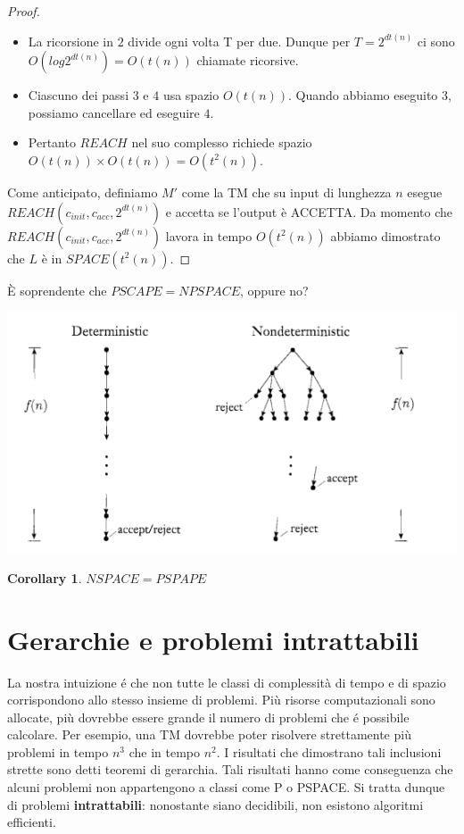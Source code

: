\documentclass[a4paper, 12pt]{article}
\newtheorem{corollary}{Corollary}[theorem]
\begin{document}
\begin{proof}
\begin{itemize}
\item La ricorsione in $2$ divide ogni volta T per due. Dunque per $T=2^{dt(n)}$ ci sono $O(log 2^{dt(n)}) = O(t(n))$ chiamate ricorsive.
\item Ciascuno dei passi $3$ e $4$ usa spazio $O(t(n))$. Quando abbiamo eseguito $3$, possiamo cancellare ed eseguire $4$.
\item Pertanto $REACH$ nel suo complesso richiede spazio $O(t(n)) \times O(t(n)) = O(t^{2}(n))$.
\end{itemize}
Come anticipato, definiamo $M'$ come la TM che su input di lunghezza $n$ esegue $REACH(c_{init}, c_{acc}, 2^{dt(n)})$ e accetta se l'output \`e ACCETTA. Da momento che $REACH(c_{init}, c_{acc}, 2^{dt(n)})$ lavora in tempo $O(t^{2}(n))$ abbiamo dimostrato che $L$ \`e in $SPACE(t^{2}(n))$.
\end{proof}
\`E soprendente che $PSCAPE=NPSPACE$, oppure no?
\begin{center}
\includegraphics[scale=0.5]{PSPACE1.png}
\end{center}

\begin{corollary}
$NSPACE = PSPAPE$
\end{corollary}

\section{Gerarchie e problemi intrattabili}
La nostra intuizione é che non tutte le classi di complessità di tempo e di spazio corrispondono allo stesso insieme di problemi. Più risorse computazionali sono allocate, più dovrebbe essere grande il numero di problemi che é possibile calcolare. Per esempio, una TM dovrebbe poter risolvere strettamente più problemi in tempo $n^3$ che in tempo $n^2$. I risultati che dimostrano tali inclusioni strette sono detti teoremi di gerarchia. Tali risultati hanno come conseguenza che alcuni problemi non appartengono a classi come P o PSPACE. Si tratta dunque di problemi \textbf{intrattabili}: nonostante siano decidibili, non esistono algoritmi efficienti.
\end{document}
